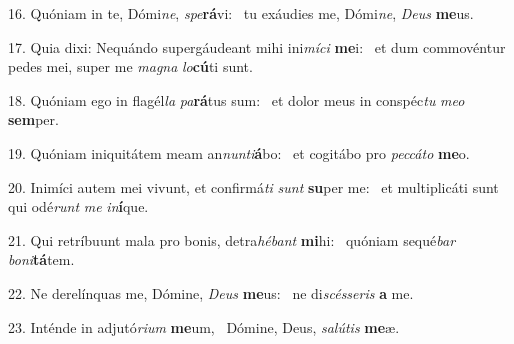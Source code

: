 16. Quóniam in te, Dómi\textit{ne}, \textit{spe}\textbf{rá}vi: \ast\  tu exáudies me, Dómi\textit{ne}, \textit{De}\textit{us} \textbf{me}us.\

17. Quia dixi: Nequándo supergáudeant mihi ini\textit{mí}\textit{ci} \textbf{me}i: \ast\  et dum commovéntur pedes mei, super me \textit{ma}\textit{gna} \textit{lo}\textbf{cú}ti sunt.\

18. Quóniam ego in flagél\textit{la} \textit{pa}\textbf{rá}tus sum: \ast\  et dolor meus in conspéc\textit{tu} \textit{me}\textit{o} \textbf{sem}per.\

19. Quóniam iniquitátem meam an\textit{nun}\textit{ti}\textbf{á}bo: \ast\  et cogitábo pro \textit{pec}\textit{cá}\textit{to} \textbf{me}o.\

20. Inimíci autem mei vivunt, et confirmá\textit{ti} \textit{sunt} \textbf{su}per me: \ast\  et multiplicáti sunt qui odé\textit{runt} \textit{me} \textit{in}\textbf{í}que.\

21. Qui retríbuunt mala pro bonis, detra\textit{hé}\textit{bant} \textbf{mi}hi: \ast\  quóniam sequé\textit{bar} \textit{bo}\textit{ni}\textbf{tá}tem.\

22. Ne derelínquas me, Dómine, \textit{De}\textit{us} \textbf{me}us: \ast\  ne di\textit{scés}\textit{se}\textit{ris} \textbf{a} me.\

23. Inténde in adjutó\textit{ri}\textit{um} \textbf{me}um, \ast\  Dómine, Deus, \textit{sa}\textit{lú}\textit{tis} \textbf{me}æ.\

